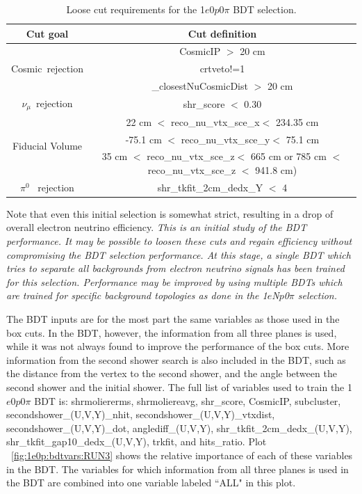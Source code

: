 \documentclass[a4paper]{article}
\newcommand{\npsel}{1$e$N$p$0$\pi$ }
\newcommand{\zpsel}{1$e$0$p$0$\pi$ }
\begin{document}
\begin{table}[h!]
\centering
\setlength{\tabcolsep}{10pt}
\renewcommand{\arraystretch}{1.25}
 \begin{tabular}{| c | c |} 
 \hline
 Cut goal & Cut definition \\
 \hline\hline
\multirow{3}{*}{Cosmic~rejection} & CosmicIP $>$ 20 \si{\cm} \\
& crtveto!=1  \\ & \_closestNuCosmicDist $>$ 20 \si{\cm}\\
 \hline
\multirow{1}{*}{$\nu_\mu$~rejection} & shr\_score $<$ 0.30 \\
 \hline
\multirow{3}{*}{Fiducial Volume} & 22 \si{\cm} $<$ reco\_nu\_vtx\_sce\_x$<$ 234.35 \si{\cm} \\
& -75.1 \si{\cm} $<$ reco\_nu\_vtx\_sce\_y$<$ 75.1 \si{\cm} \\ & 35 \si{\cm} $<$ reco\_nu\_vtx\_sce\_z$<$ 665 \si{\cm}  or 785 \si{\cm} $<$ reco\_nu\_vtx\_sce\_z $<$ 941.8 \si{\cm})\\
 \hline
 \multirow{1}{*}{$\pi^0$ ~rejection} & shr\_tkfit\_2cm\_dedx\_Y $<$ 4 \\
 \hline
 \end{tabular}
 \caption{\label{tab:1e0p:loosecut} Loose cut requirements for the \zpsel BDT selection.}
\end{table}


Note that even this initial selection is somewhat strict, resulting in a drop of overall electron neutrino efficiency.
\emph{This is an initial study of the BDT performance. It may be possible to loosen these cuts and regain efficiency without compromising the BDT selection performance. At this stage, a single BDT which tries to separate all backgrounds from electron neutrino signals has been trained for this selection.  Performance may be improved by using multiple BDTs which are trained for specific background topologies as done in the \npsel selection. }

The BDT inputs are for the most part the same variables as those used in the box cuts.  In the BDT, however, the information from all three planes is used, while it was not always found to improve the performance of the box cuts.   More information from the second shower search is also included in the BDT, such as the distance from the vertex to the second shower, and the angle between the second shower and the initial shower. The full list of variables used to train the \zpsel BDT is: shrmoliererms, shrmoliereavg, shr\_score, CosmicIP, subcluster, secondshower\_(U,V,Y)\_nhit, secondshower\_(U,V,Y)\_vtxdist, secondshower\_(U,V,Y)\_dot, anglediff\_(U,V,Y), shr\_tkfit\_2cm\_dedx\_(U,V,Y), shr\_tkfit\_gap10\_dedx\_(U,V,Y), trkfit, and hits\_ratio. Plot ~\ref{fig:1e0p:bdtvars:RUN3} shows the relative importance of each of these variables in the BDT.  The variables for which information from all three planes is used in the BDT are combined into one variable labeled ``ALL" in this plot.  
\end{document}
